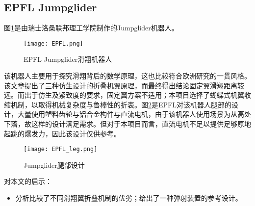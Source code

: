 \subsection{EPFL Jumpglider}
图\ref{fig:EPFL}是由瑞士洛桑联邦理工学院制作的Jumpglider机器人。
\begin{figure}[H]
  \centering
  \texttt{[image: EPFL.png]}
  \caption{EPFL Jumpglider滑翔机器人\cite{EPFL}}
  \label{fig:EPFL}
\end{figure}
该机器人主要用于探究滑翔背后的数学原理，这也比较符合欧洲研究的一贯风格。该文章提出了三种仿生设计的折叠机翼原理，而最终得出结论固定翼滑翔距离较远。而出于仿生及紧致度的要求，固定翼方案不适用；本项目选择了蝴蝶式机翼收缩机制，以取得机械复杂度与鲁棒性的折衷。图\ref{fig:EPFL_leg}是EPFL对该机器人腿部的设计，大量使用塑料齿轮与铝合金构件与直流电机，由于该机器人使用场景为从高处下落，故这样的设计满足需求。但对于本项目而言，直流电机不足以提供足够原地起跳的爆发力，因此该设计仅供参考。
\begin{figure}[H]
  \centering
  \texttt{[image: EPFL\_leg.png]}
  \caption{Jumpglider腿部设计\cite{EPFL}}
  \label{fig:EPFL_leg}
\end{figure}
对本文的启示：
\begin{itemize}
  \item 分析比较了不同滑翔翼折叠机制的优劣；给出了一种弹射装置的参考设计。
\end{itemize}